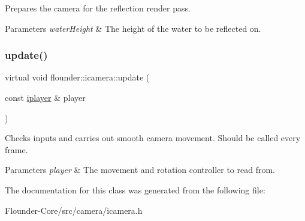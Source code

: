 Prepares the camera for the reflection render pass. 


\begin{DoxyParams}{Parameters}
{\em water\+Height} & The height of the water to be reflected on. \\
\hline
\end{DoxyParams}
\mbox{\label{classflounder_1_1icamera_ac488c3db589fbba024d80d1f41dd7983}} 
\subsubsection{\texorpdfstring{update()}{update()}}
{\footnotesize\ttfamily virtual void flounder\+::icamera\+::update (\begin{DoxyParamCaption}\item[{const \hyperlink{classflounder_1_1iplayer}{iplayer} \&}]{player }\end{DoxyParamCaption})\hspace{0.3cm}{\ttfamily [pure virtual]}}



Checks inputs and carries out smooth camera movement. Should be called every frame. 


\begin{DoxyParams}{Parameters}
{\em player} & The movement and rotation controller to read from. \\
\hline
\end{DoxyParams}


The documentation for this class was generated from the following file\+:\begin{DoxyCompactItemize}
\item 
Flounder-\/\+Core/src/camera/icamera.\+h\end{DoxyCompactItemize}
